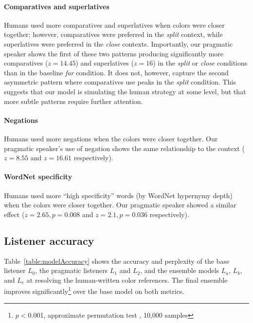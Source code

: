 \documentclass[11pt,letterpaper]{article}
\newcommand{\Listener}{L}
\renewcommand{\|}{\mid}
\newcommand{\Tabref}[1]{Table~\ref{#1}}
\newcommand{\cond}{\emph}
\begin{document}
\paragraph{Comparatives and superlatives} Humans used more comparatives and
superlatives when colors were closer together; however, comparatives were
preferred in the  \cond{split} context, while superlatives were preferred in
the \cond{close}
 contexts. Importantly, our pragmatic speaker shows the first of these two patterns
producing significantly more comparatives ($z = 14.45$) and superlatives ($z = 16$) in the \cond{split} or \cond{close} conditions than in the baseline \cond{far} condition. It does not, however, capture the second asymmetric pattern where comparatives use peaks in the \emph{split} condition. This suggests that our model is simulating the human strategy at some level, but that more subtle patterns require further attention.

\paragraph{Negations} Humans used more negations when the colors were closer
together. Our pragmatic speaker's use of negation shows the  same relationship to the context ($z = 8.55$ and $z= 16.61$ respectively).

\paragraph{WordNet specificity} Humans used more ``high specificity'' words
(by WordNet hypernymy depth) when the colors were closer together.
Our pragmatic speaker showed a similar effect ($z = 2.65, p =0.008$ and
$z = 2.1, p =0.036$ respectively).

\subsection{Listener accuracy}

\Tabref{table:modelAccuracy} shows the accuracy
and perplexity of the base listener $\Listener_0$, the pragmatic listeners
$\Listener_1$ and $\Listener_2$, and the ensemble models $\Listener_a$,
$\Listener_b$, and $\Listener_e$ at resolving the human-written color
references. The
final ensemble improves significantly\footnote{$p <{}$0.001, approximate
permutation test \cite{Pado2006}, 10,000 samples} over the base model on both metrics.

\newcommand{\intended}{\framebox}
\end{document}
